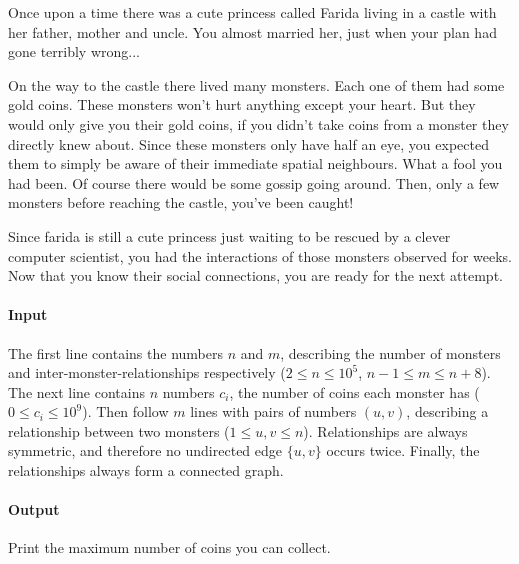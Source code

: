 



\makeheader

Once upon a time there was a cute princess called Farida living in a castle with her father, mother and uncle.
You almost married her, just when your plan had gone terribly wrong...

On the way to the castle there lived many monsters.
Each one of them had some gold coins.
These monsters won't hurt anything except your heart.
But they would only give you their gold coins, if you didn't take coins from a monster they directly knew about.
Since these monsters only have half an eye, you expected them to simply be aware of their immediate spatial neighbours.
What a fool you had been.
Of course there would be some gossip going around.
Then, only a few monsters before reaching the castle, you've been caught!

Since farida is still a cute princess just waiting to be rescued by a clever computer scientist, you had the interactions of those monsters observed for weeks.
Now that you know their social connections, you are ready for the next attempt.

\paragraph*{Input}

The first line contains the numbers $n$ and $m$, describing the number of monsters and inter-monster-relationships respectively ($2 \leq n \leq 10^5$, $n - 1 \leq m \leq n + 8$).
The next line contains $n$ numbers $c_i$, the number of coins each monster has ($0 \leq c_i \leq 10^9$).
Then follow $m$ lines with pairs of numbers $(u, v)$, describing a relationship between two monsters ($1 \leq u, v \leq n$).
Relationships are always symmetric, and therefore no undirected edge $\{u, v\}$ occurs twice.
Finally, the relationships always form a connected graph.

\paragraph*{Output}

Print the maximum number of coins you can collect.

\begin{samples}
\end{samples}

